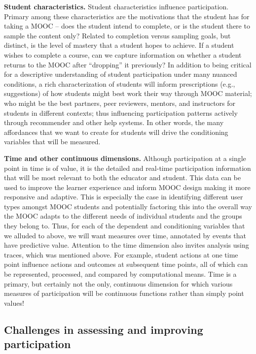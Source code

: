 \textbf{Student characteristics.} Student characteristics influence
participation. Primary among these characteristics are the motivations
that the student has for taking a MOOC -- does the student intend to
complete, or is the student there to sample the content only? Related to
completion versus sampling goals, but distinct, is the level of mastery
that a student hopes to achieve. If a student wishes to complete a
course, can we capture information on whether a student returns to the
MOOC after ``dropping'' it previously?  In addition to being critical for
a descriptive understanding of student participation under many nuanced
conditions, a rich characterization of students will inform
prescriptions (e.g., suggestions) of how students might best work their
way through MOOC material; who might be the best partners, peer
reviewers, mentors, and instructors for students in different contexts;
thus influencing participation patterns actively through recommender and
other help systems. In other words, the many affordances that we want to
create for students will drive the conditioning variables that will be
measured.  

\textbf{Time and other continuous dimensions.}  Although participation
at a single point in time is of value, it is the detailed and real-time
participation information that will be most relevant to both the
educator and student. This data can be used to improve the learner
experience and inform MOOC design making it more responsive and
adaptive. This is especially the case in identifying different user
types amongst MOOC students and potentially factoring this into the
overall way the MOOC adapts to the different needs of individual
students and the groups they belong to. Thus, for each of the dependent
and conditioning variables that we alluded to above, we will want
measures over time, annotated by events that have predictive value.
Attention to the time dimension also invites analysis using traces,
which was mentioned above. For example, student actions at one time
point influence actions and outcomes at subsequent time points, all of
which can be represented, processed, and compared by computational
means.  Time is a primary, but certainly not the only, continuous
dimension for which various measures of participation will be continuous
functions rather than simply point values!

\subsection{Challenges in assessing and improving participation}

